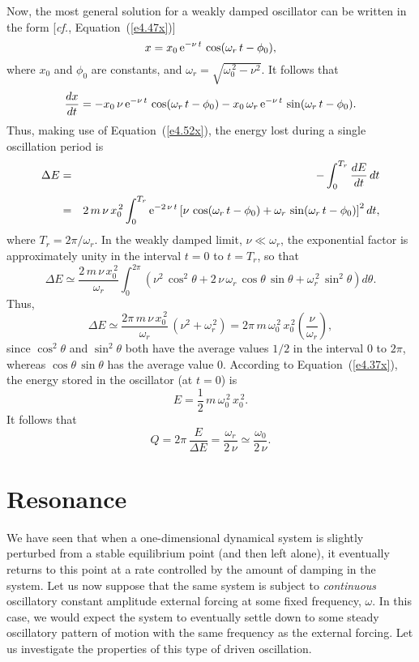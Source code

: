 Now, the most general solution for a weakly damped 
oscillator can be written in the form
[{\em cf.}, Equation~(\ref{e4.47x})]
\begin{equation}
x = x_0\,{\rm e}^{-\nu\,t}\,\cos(\omega_r\,t-\phi_0),
\end{equation}
where $x_0$ and $\phi_0$ are constants, and $\omega_r=\sqrt{\omega_0^{\,2}-\nu^2}$. It follows that
\begin{equation}
\frac{dx}{dt} =- x_0\,\nu\,{\rm e}^{-\nu\,t}\,\cos(\omega_r\,t-\phi_0)-
x_0\,\omega_r\,{\rm e}^{-\nu\,t}\,\sin(\omega_r\,t-\phi_0).
\end{equation}
Thus, making use of Equation~(\ref{e4.52x}), the energy lost during a single oscillation period is
\begin{eqnarray}
\Delta E &=& -\int_0^{T_r} \frac{dE}{dt}\,dt\\[0.5ex]
&=& 2\,m\,\nu\,x_0^{\,2}\int_0^{T_r}{\rm e}^{-2\,\nu\,t}\left[\nu\,\cos(\omega_r\,t-\phi_0) + \omega_r\,\sin(\omega_r\,t-\phi_0)\right]^2 dt,\nonumber
\end{eqnarray}
where $T_r=2\pi/\omega_r$. 
In the weakly damped limit, $\nu\ll \omega_r$, the exponential factor is approximately
unity in the interval $t=0$ to $t=T_r$, so that
\begin{equation}
\Delta E \simeq \frac{2\,m\,\nu\,x_0^{\,2}}{\omega_r}\int_0^{2\pi} \left(
\nu^2\,\cos^2\theta + 2\,\nu\,\omega_r\,\cos\theta\,\sin\theta + \omega_r^{\,2}\,\sin^2\theta\right)d\theta.
\end{equation}
Thus,
\begin{equation}
\Delta E \simeq \frac{2\pi\,m\,\nu\,x_0^{\,2}}{\omega_r}\,(\nu^2+\omega_r^{\,2}) =2 \pi\,m\,\omega_0^{\,2}\,x_0^{\,2}\left(\frac{\nu}{\omega_r}\right),
\end{equation}
since  $\cos^2\theta$ and $\sin^2\theta$ both have the average values $1/2$ in the interval
$0$ to $2\pi$, whereas  $\cos\theta\,\sin\theta$ has the average value $0$. 
According to Equation~(\ref{e4.37x}), the energy stored in the oscillator
(at $t=0$) is
\begin{equation}
E = \frac{1}{2}\,m\,\omega_0^{\,2}\,x_0^{\,2}.
\end{equation}
It follows that
\begin{equation}
Q = 2\pi\,\frac{E}{\Delta E} = \frac{\omega_r}{2\,\nu}\simeq \frac{\omega_0}{2\,\nu}.
\end{equation}

\section{Resonance}\label{eres}
We have seen that when a one-dimensional dynamical system is slightly perturbed
from a stable equilibrium point (and then left alone), it eventually returns to this point at
a rate controlled by the amount of damping in the system. Let us now
suppose that the same system is subject to {\em continuous}\/ oscillatory constant amplitude
external forcing at some fixed frequency, $\omega$. In this
case, we would expect the system to eventually settle down to some steady oscillatory pattern of motion
with the same frequency as the external forcing. Let us investigate the properties of this type of driven oscillation.

